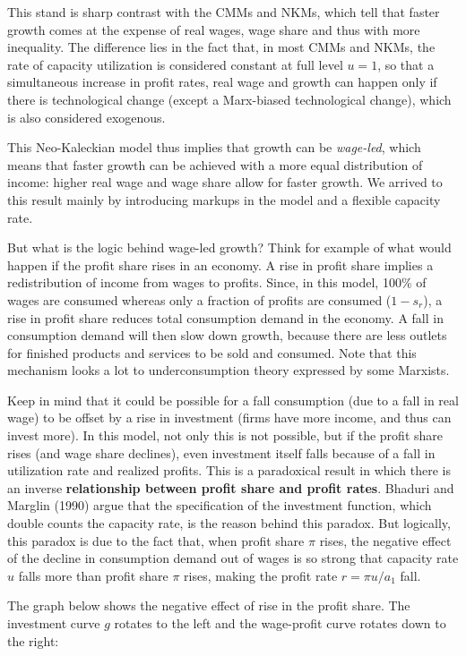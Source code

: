 \documentclass[
  letterpaper,
  DIV=11,
  numbers=noendperiod]{scrreprt}
\begin{document}
This stand is sharp contrast with the CMMs and NKMs, which tell that
faster growth comes at the expense of real wages, wage share and thus
with more inequality. The difference lies in the fact that, in most CMMs
and NKMs, the rate of capacity utilization is considered constant at
full level \(u = 1\), so that a simultaneous increase in profit rates,
real wage and growth can happen only if there is technological change
(except a Marx-biased technological change), which is also considered
exogenous.

This Neo-Kaleckian model thus implies that growth can be
\emph{wage-led}, which means that faster growth can be achieved with a
more equal distribution of income: higher real wage and wage share allow
for faster growth. We arrived to this result mainly by introducing
markups in the model and a flexible capacity rate.

But what is the logic behind wage-led growth? Think for example of what
would happen if the profit share rises in an economy. A rise in profit
share implies a redistribution of income from wages to profits. Since,
in this model, 100\% of wages are consumed whereas only a fraction of
profits are consumed (\(1-s_r\)), a rise in profit share reduces total
consumption demand in the economy. A fall in consumption demand will
then slow down growth, because there are less outlets for finished
products and services to be sold and consumed. Note that this mechanism
looks a lot to underconsumption theory expressed by some Marxists.

Keep in mind that it could be possible for a fall consumption (due to a
fall in real wage) to be offset by a rise in investment (firms have more
income, and thus can invest more). In this model, not only this is not
possible, but if the profit share rises (and wage share declines), even
investment itself falls because of a fall in utilization rate and
realized profits. This is a paradoxical result in which there is an
inverse \textbf{relationship between profit share and profit rates}.
Bhaduri and Marglin (1990) argue that the specification of the
investment function, which double counts the capacity rate, is the
reason behind this paradox. But logically, this paradox is due to the
fact that, when profit share \(\pi\) rises, the negative effect of the
decline in consumption demand out of wages is so strong that capacity
rate \(u\) falls more than profit share \(\pi\) rises, making the profit
rate \(r = \pi u/a_1\) fall.

The graph below shows the negative effect of rise in the profit share.
The investment curve \(g\) rotates to the left and the wage-profit curve
rotates down to the right:
\end{document}
